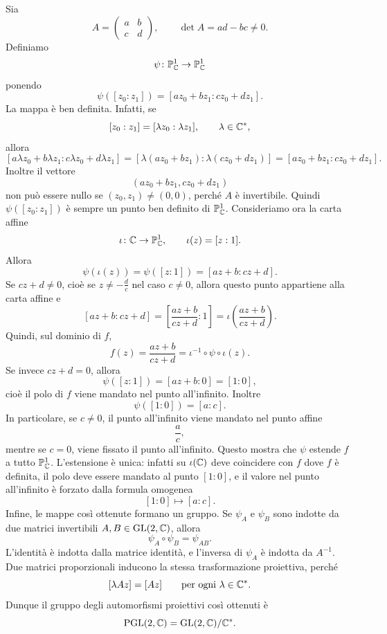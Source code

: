 \documentclass[a4paper]{article}
\begin{document}
\begin{snippetproof}{}
    Sia
    \[
        A=
        \begin{pmatrix}
            a & b\\
            c & d
        \end{pmatrix},
        \qquad
        \det A=ad-bc\neq0.
    \]
    Definiamo
    \[
        \psi\colon\mathbb{P}^1_{\mathbb{C}}\to\mathbb{P}^1_{\mathbb{C}}
    \]
    ponendo
    \[
        \psi([z_0:z_1])
        =
        [az_0+bz_1:cz_0+dz_1].
    \]
    La mappa è ben definita. Infatti, se
    \[
        [z_0:z_1]=[\lambda z_0:\lambda z_1],
        \qquad
        \lambda\in\mathbb{C}^*,
    \]
    allora
    \[
        [a\lambda z_0+b\lambda z_1:c\lambda z_0+d\lambda z_1]
        =
        [\lambda(az_0+bz_1):\lambda(cz_0+dz_1)]
        =
        [az_0+bz_1:cz_0+dz_1].
    \]
    Inoltre il vettore
    \[
        (az_0+bz_1,cz_0+dz_1)
    \]
    non può essere nullo se \((z_0,z_1)\neq(0,0)\), perché \(A\) è invertibile. Quindi \(\psi([z_0:z_1])\) è sempre un punto ben definito di \(\mathbb{P}^1_{\mathbb{C}}\).
    Consideriamo ora la carta affine
    \[
        \iota\colon\mathbb{C}\to\mathbb{P}^1_{\mathbb{C}},
        \qquad
        \iota(z)=[z:1].
    \]
    Allora
    \[
        \psi(\iota(z))
        =
        \psi([z:1])
        =
        [az+b:cz+d].
    \]
    Se \(cz+d\neq0\), cioè se \(z\neq-\frac dc\) nel caso \(c\neq0\), allora questo punto appartiene alla carta affine e
    \[
        [az+b:cz+d]
        =
        \left[
            \frac{az+b}{cz+d}:1
        \right]
        =
        \iota\left(\frac{az+b}{cz+d}\right).
    \]
    Quindi, sul dominio di \(f\),
    \[
        f(z)=\frac{az+b}{cz+d}
        =
        \iota^{-1}\circ\psi\circ\iota(z).
    \]
    Se invece \(cz+d=0\), allora
    \[
        \psi([z:1])=[az+b:0]=[1:0],
    \]
    cioè il polo di \(f\) viene mandato nel punto all'infinito. Inoltre
    \[
        \psi([1:0])=[a:c].
    \]
    In particolare, se \(c\neq0\), il punto all'infinito viene mandato nel punto affine
    \[
        \frac ac,
    \]
    mentre se \(c=0\), viene fissato il punto all'infinito.
    Questo mostra che \(\psi\) estende \(f\) a tutto \(\mathbb{P}^1_{\mathbb{C}}\). L'estensione è unica: infatti su \(\iota(\mathbb{C})\) deve coincidere con \(f\) dove \(f\) è definita, il polo deve essere mandato al punto \([1:0]\), e il valore nel punto all'infinito è forzato dalla formula omogenea
    \[
        [1:0]\longmapsto[a:c].
    \]
    Infine, le mappe così ottenute formano un gruppo. Se \(\psi_A\) e \(\psi_B\) sono indotte da due matrici invertibili \(A,B\in\operatorname{GL}(2,\mathbb{C})\), allora
    \[
        \psi_A\circ\psi_B=\psi_{AB}.
    \]
    L'identità è indotta dalla matrice identità, e l'inversa di \(\psi_A\) è indotta da \(A^{-1}\). Due matrici proporzionali inducono la stessa trasformazione proiettiva, perché
    \[
        [\lambda Az]=[Az]
        \qquad
        \text{per ogni }\lambda\in\mathbb{C}^*.
    \]
    Dunque il gruppo degli automorfismi proiettivi così ottenuti è
    \[
        \operatorname{PGL}(2,\mathbb{C})
        =
        \operatorname{GL}(2,\mathbb{C})/\mathbb{C}^*.
    \]
\end{snippetproof}
\end{document}
